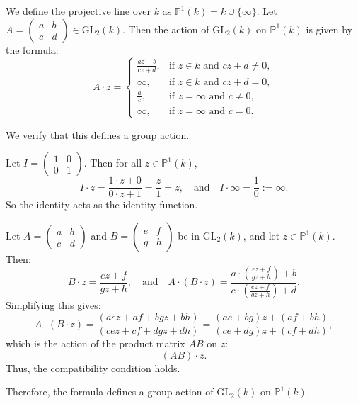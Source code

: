 \documentclass[12pt]{article}
\begin{document}
\begin{enumerate}[label=(\arabic*)]
We define the projective line over \( k \) as \( \mathbb{P}^1(k) = k \cup \{\infty\} \). Let \( A = \begin{pmatrix} a & b \\ c & d \end{pmatrix} \in \mathrm{GL}_2(k) \). Then the action of \( \mathrm{GL}_2(k) \) on \( \mathbb{P}^1(k) \) is given by the formula:
\[
A \cdot z =
\begin{cases}
\displaystyle \frac{az + b}{cz + d}, & \text{if } z \in k \text{ and } cz + d \neq 0, \\
\infty, & \text{if } z \in k \text{ and } cz + d = 0, \\
\displaystyle \frac{a}{c}, & \text{if } z = \infty \text{ and } c \neq 0, \\
\infty, & \text{if } z = \infty \text{ and } c = 0.
\end{cases}
\]

We verify that this defines a group action.

Let \( I = \begin{pmatrix} 1 & 0 \\ 0 & 1 \end{pmatrix} \). Then for all \( z \in \mathbb{P}^1(k) \),
\[
I \cdot z = \frac{1 \cdot z + 0}{0 \cdot z + 1} = \frac{z}{1} = z, \quad \text{and} \quad I \cdot \infty = \frac{1}{0} := \infty.
\]
So the identity acts as the identity function.

Let \( A = \begin{pmatrix} a & b \\ c & d \end{pmatrix} \) and \( B = \begin{pmatrix} e & f \\ g & h \end{pmatrix} \) be in \( \mathrm{GL}_2(k) \), and let \( z \in \mathbb{P}^1(k) \). Then:
\[
B \cdot z = \frac{ez + f}{gz + h}, \quad \text{and} \quad A \cdot (B \cdot z) = \frac{a \cdot \left( \frac{ez + f}{gz + h} \right) + b}{c \cdot \left( \frac{ez + f}{gz + h} \right) + d}.
\]
Simplifying this gives:
\[
A \cdot (B \cdot z) = \frac{(aez + af + bgz + bh)}{(cez + cf + dgz + dh)} = \frac{(ae + bg)z + (af + bh)}{(ce + dg)z + (cf + dh)},
\]
which is the action of the product matrix \( AB \) on \( z \):
\[
(AB) \cdot z.
\]
Thus, the compatibility condition holds.

\medskip

Therefore, the formula defines a group action of \( \mathrm{GL}_2(k) \) on \( \mathbb{P}^1(k) \).


\end{enumerate}
\end{document}
